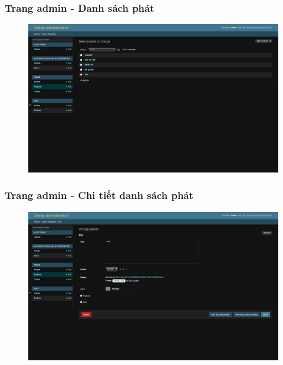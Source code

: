 \documentclass[a4paper]{article}
\begin{document}
\subsubsection{Trang admin - Danh sách phát}
\begin{figure}[h!]
\begin{center}
\includegraphics[width=12cm]{admin_playlist.png}
\end{center}
\end{figure}

\subsubsection{Trang admin - Chi tiết danh sách phát}
\begin{figure}[h!]
\begin{center}
\includegraphics[width=12cm]{admin_playlist_detail.png}
\end{center}
\end{figure}
\newpage
\end{document}
